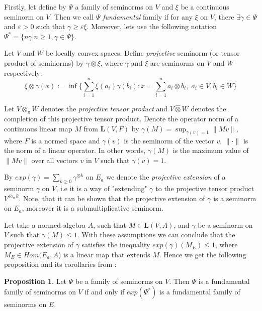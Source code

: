 \documentclass[12pt,a4paper]{report}
\theoremstyle{definition}
\newtheorem{proposition}{Proposition}
\begin{document}
Firstly, let define by $\Psi$ a family of seminorms on $V$ and $\xi$ be a continuous seminorm on $V$. Then we call $\Psi$  \textit{fundamental} family if for any  $\xi$ on $V$, there $\exists \gamma \in \Psi $ and $\varepsilon > 0$ such that $\gamma \geq \varepsilon \xi$. Moreover, lets use the following notation $\Psi^* = \{n\gamma |n \geq 1, \gamma \in \Psi\}$.


Let $V$ and $W$ be locally convex spaces. Define \textit{projective} seminorm (or tensor product of seminorms) by $\gamma \otimes \xi$, where $\gamma$ and $\xi$ are seminorms on $V$ and $W$ respectively:
\begin{equation}
	\xi\otimes \gamma(x) := \inf\{\sum_{i=1}^{n}\xi(a_i)\gamma(b_i):x=\sum_{i=1}^{n}a_i \otimes b_i,\; a_i\in V, b_i \in W  \}
\end{equation}

 Let $V\otimes_\pi W$ denotes the \textit{projective tensor product} and $V\hat{\otimes} W$ denotes the completion of this projective tensor product. Denote the operator norm of a continuous linear map $M$  from $\textbf{L}(V, F)$ by $\gamma(M) = \sup_{\gamma(v)=1} \lVert Mv \rVert$, where $F$ is a normed space and $\gamma(v)$ is the seminorm of the vector $v$, $\lVert \cdot \rVert$ is the norm of a linear operator. In other words, $\gamma(M)$ is the maximum value of $\lVert Mv \rVert$ over all vectors $v$ in $V$ such that $\gamma(v) = 1$.
 

By  $exp(\gamma) =\sum_{k\geq0}  \gamma ^{\otimes k}$ on $E_a$ we denote the \textit{projective extension } of a seminorm $\gamma$ on $V$, i.e it is a way of "extending" $\gamma$ to the projective tensor product $V^{\otimes_\pi k}$. Note, that it can be shown that the projective extension of $\gamma$ is a seminorm on $E_a$, moreover it is a submultiplicative seminorm.

Let take a normed algebra $A$, such that $M \in \textbf{L}(V, A)$, and $\gamma$ be a seminorm on $V$ such that $\gamma(M)\leq 1$. With these assumptions we can conclude that the projective extension of $\gamma$ satisfies the inequality $exp(\gamma)(M_E)\leq 1$, where $M_E \in Hom(E_a, A$) is a linear map that extends $M$.
Hence we get the following proposition and its corollaries from \parencite[][]{chevyrev2016characteristic}:

\begin{proposition} \label{Prop2.3} %
	Let $\Psi$ be a family of seminorms on $V$. Then $\Psi$ is a fundamental
	family of seminorms on $V$ if and only if $exp(\Psi^*)$ is a fundamental family of seminorms on $E$.
\end{proposition}
\end{document}
